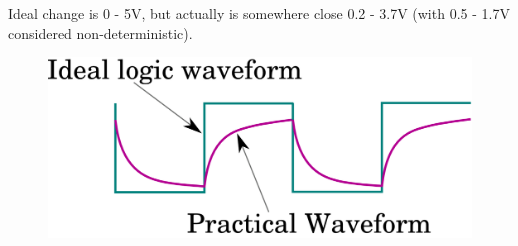 \documentclass[twocolumn,english]{article}
\begin{document}
Ideal change is 0 - 5V, but actually is somewhere close 0.2 - 3.7V
(with 0.5 - 1.7V considered non-deterministic).

\begin{figure}[H]
\noindent \centering{}\includegraphics[width=0.15\paperwidth]{img/waveform}
\end{figure}
\end{document}
